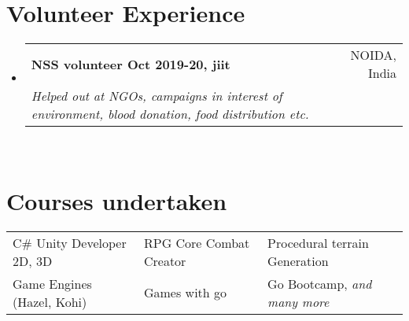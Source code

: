 \documentclass[a4paper,10pt]{article}
\makeatletter
\newcommand{\resumeSubheading}[4]{
  \vspace{-1pt}\item
    \begin{tabular*}{0.97\textwidth}{l@{\extracolsep{\fill}}r}
      \textbf{#1} & #2 \\
      \textit{#3} & \textit{#4} \\
    \end{tabular*}\vspace{-5pt}
}
\newcommand{\resumeSubHeadingListStart}{\begin{itemize}[leftmargin=*]}
\newcommand{\resumeSubHeadingListEnd}{\end{itemize}}
\makeatother
\begin{document}
\section{Volunteer Experience}
  \resumeSubHeadingListStart
    \resumeSubheading
        {NSS volunteer Oct 2019-20, jiit}{NOIDA, India}
        {Helped out at NGOs, campaigns in interest of environment, blood donation, food distribution etc. }{} \\
  \resumeSubHeadingListEnd
\vspace{-6pt}
\section{Courses undertaken}
\begin{tabular}{p{}p{}p{}}
    {C\# Unity Developer 2D, 3D}&{RPG Core Combat Creator}&{Procedural terrain Generation}\\
    {Game Engines (Hazel, Kohi)}&{Games with go}&{Go Bootcamp, \textit{and many more}}\\
\end{tabular}
\end{document}
